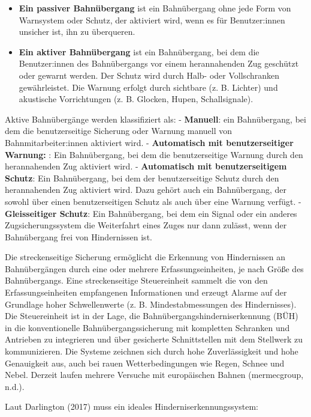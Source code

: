 \documentclass[
]{book}
\providecommand{\tightlist}{%
  \setlength{\itemsep}{0pt}\setlength{\parskip}{0pt}}
\begin{document}
\begin{itemize}
\tightlist
\item
  \textbf{Ein passiver Bahnübergang } ist ein Bahnübergang ohne jede Form von Warnsystem oder Schutz, der aktiviert wird, wenn es für Benutzer:innen unsicher ist, ihn zu überqueren.
\item
  \textbf{Ein aktiver Bahnübergang } ist ein Bahnübergang, bei dem die Benutzer:innen des Bahnübergangs vor einem herannahenden Zug geschützt oder gewarnt werden. Der Schutz wird durch Halb- oder Vollschranken gewährleistet. Die Warnung erfolgt durch sichtbare (z. B. Lichter) und akustische Vorrichtungen (z. B. Glocken, Hupen, Schallsignale).
\end{itemize}

Aktive Bahnübergänge werden klassifiziert als:
- \textbf{Manuell}: ein Bahnübergang, bei dem die benutzerseitige Sicherung oder Warnung manuell von Bahnmitarbeiter:innen aktiviert wird.
- \textbf{Automatisch mit benutzerseitiger Warnung: }: Ein Bahnübergang, bei dem die benutzerseitige Warnung durch den herannahenden Zug aktiviert wird.
- \textbf{Automatisch mit benutzerseitigem Schutz}: Ein Bahnübergang, bei dem der benutzerseitige Schutz durch den herannahenden Zug aktiviert wird. Dazu gehört auch ein Bahnübergang, der sowohl über einen benutzerseitigen Schutz als auch über eine Warnung verfügt.
- \textbf{Gleisseitiger Schutz}: Ein Bahnübergang, bei dem ein Signal oder ein anderes Zugsicherungssystem die Weiterfahrt eines Zuges nur dann zulässt, wenn der Bahnübergang frei von Hindernissen ist.

Die streckenseitige Sicherung ermöglicht die Erkennung von Hindernissen an Bahnübergängen durch eine oder mehrere Erfassungseinheiten, je nach Größe des Bahnübergangs. Eine streckenseitige Steuereinheit sammelt die von den Erfassungseinheiten empfangenen Informationen und erzeugt Alarme auf der Grundlage hoher Schwellenwerte (z. B. Mindestabmessungen des Hindernisses). Die Steuereinheit ist in der Lage, die Bahnübergangshinderniserkennung (BÜH) in die konventionelle Bahnübergangssicherung mit kompletten Schranken und Antrieben zu integrieren und über gesicherte Schnittstellen mit dem Stellwerk zu kommunizieren. Die Systeme zeichnen sich durch hohe Zuverlässigkeit und hohe Genauigkeit aus, auch bei rauen Wetterbedingungen wie Regen, Schnee und Nebel. Derzeit laufen mehrere Versuche mit europäischen Bahnen (mermecgroup, n.d.).

Laut Darlington (2017) muss ein ideales Hinderniserkennungssystem:
\end{document}

